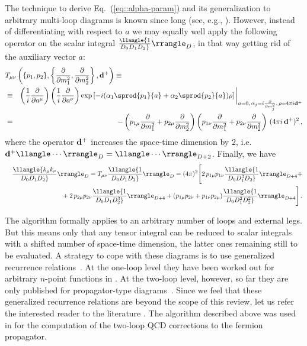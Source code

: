 %
The technique to derive Eq.~(\ref{eq::alpha-param}) and its
generalization to arbitrary multi-loop diagrams is known since long (see,
e.g., \cite{BreMai77}).  However, instead of differentiating with
respect to $a$ we may equally well apply the following operator on the
scalar integral $\llangle{1\over D_0 D_1 D_2}\rrangle_D$, in that way
getting rid of the auxiliary vector $a$:
%
\begin{eqnarray}
\lefteqn{T_{\mu\nu}\left(\{p_1,p_2\},\left\{{\partial\over \partial
  m_1^2},{\partial\over \partial m_2^2}\right\}, {\bf d^+}\right) \equiv } 
\nonumber\\&\equiv&
\left({1\over i}{\partial\over \partial a^\mu}\right)
\left({1\over i}{\partial\over \partial a^\nu}\right)
  \exp\left[-i(\alpha_1 \sprod{p_1}{a} + \alpha_2\sprod{p_2}{a})
  \rho\right]\bigg|_{a=0,\,\alpha_j = 
    i{\partial\over \partial m_j^2},\,
    \rho    = 4\pi i {\bf d^+}}
  \nonumber\\&=& -\left(p_{1\mu}{\partial\over \partial m_1^2} + 
  p_{2\mu}{\partial\over \partial m_2^2}\right)
  \left(p_{1\nu}{\partial\over \partial m_1^2} + 
  p_{2\nu}{\partial\over \partial m_2^2}\right)\,(4\pi i\,{\bf d^+})^2\,,
\end{eqnarray}
%
where the operator ${\bf d^+}$ increases the space-time dimension by
$2$, i.e.\ ${\bf d^+} \llangle \cdots\rrangle_D = \llangle
\cdots\rrangle_{D+2}$. Finally, we have
%
\begin{eqnarray}
  &&\llangle {k_\mu k_\nu\over D_0 D_1 D_2}\rrangle_D = 
  T_{\mu\nu}\llangle{1\over D_0 D_1 D_2}\rrangle_D = (4\pi)^2 \Bigg[
  2\,p_{1\mu} p_{1\nu}\llangle{1\over D_0 D_1^3 D_2}\rrangle_{D+4} +
  \nonumber\\&&\mbox{\hspace{6ex}} +
  2\,p_{2\mu} p_{2\nu}\llangle{1\over D_0 D_1 D_2^3}\rrangle_{D+4} +
  (p_{1\mu} p_{2\nu} + p_{1\nu} p_{2\mu}) 
  \llangle{1\over D_0 D_1^2 D_2^2}\rrangle_{D+4}\Bigg]\,.
\end{eqnarray}

The algorithm formally applies to an arbitrary number of loops and
external legs.  But this means only that any tensor integral can be
reduced to scalar integrals with a shifted number of space-time
dimension, the latter ones remaining still to be evaluated. A strategy
to cope with these diagrams is to use generalized recurrence
relations~\cite{Tar97}.  At the one-loop level they have been worked out
for arbitrary $n$-point functions in \cite{Tar96}. At the two-loop
level, however, so far they are only published for propagator-type
diagrams~\cite{Tar97}.  Since we feel that these generalized recurrence
relations are beyond the scope of this review, let us refer the
interested reader to the literature \cite{Tar97,TarRhein98}.
The algorithm described above was used in \cite{FleJegTarVer99} for the
computation of the two-loop QCD corrections to the fermion propagator.

